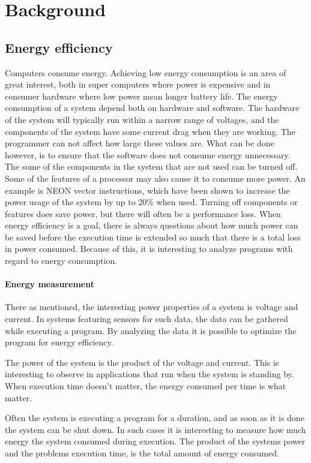 \chapter[Background]{Background}

\section{Energy efficiency} \label{energymeasurement}
Computers consume energy.
Achieving low energy consumption is an area of great interest, both in super computers where power is expensive and in consumer hardware where low power mean longer battery life.
The energy consumption of a system depend both on hardware and software.
The hardware of the system will typically run within a narrow range of voltages, and the components of the system have some current drag when they are working.
The programmer can not affect how large these values are.
What can be done however, is to ensure that the software does not consume energy unnecessary.
The some of the components in the system that are not used can be turned off.
Some of the features of a processor may also cause it to consume more power.
An example is NEON vector instructions, which have been shown to increase the power usage of the system by up to 20\%\cite{TrondIngeLillesand} when used.
Turning off components or features does save power, but there will often be a performance loss.
When energy efficiency is a goal, there is always questions about how much power can be saved before the execution time is extended so much that there is a total loss in power consumed.
Because of this, it is interesting to analyze programs with regard to energy consumption.

\subsubsection{Energy measurement}
There as mentioned, the interesting power properties of a system is voltage and current.
In systems featuring sensors for such data, the data can be gathered while executing a program.
By analyzing the data it is possible to optimize the program for energy efficiency.

The power of the system is the product of the voltage and current.
This is interesting to observe in applications that run when the system is standing by.
When execution time doesn't matter, the energy consumed per time is what matter.

Often the system is executing a program for a duration, and as soon as it is done the system can be shut down.
In such cases it is interesting to measure how much energy the system consumed during execution.
The product of the systems power and the problems execution time, is the total amount of energy consumed.


